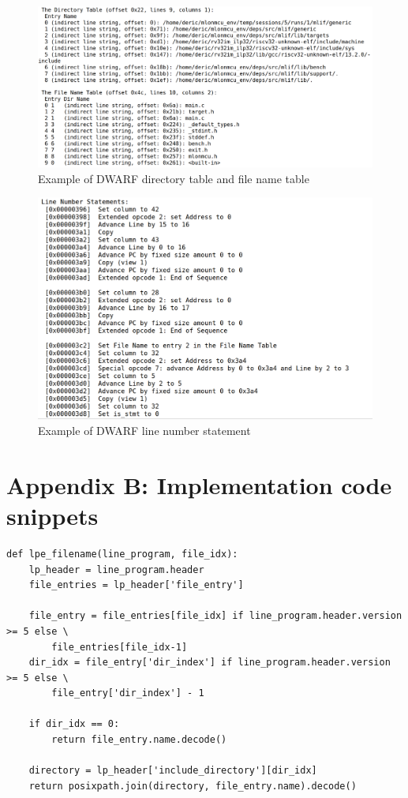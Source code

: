 \begin{figure}[ht]
    \centering
    \includegraphics[width=.95\linewidth]{figures/DWARF_debug_prologue.png}
    \caption{Example of DWARF directory table and file name table}
    \label{fig:dwarf_debug_prologue}
\end{figure}

\begin{figure}[ht]
    \centering
    \includegraphics[width=.85\linewidth]{figures/DWARF_debug_main.png}
    \caption{Example of DWARF line number statement}
    \label{fig:dwarf_debug_main}
\end{figure}

\section{Appendix B: Implementation code snippets}
\begin{center}
\begin{minipage}{\textwidth}
\begin{lstlisting}
def lpe_filename(line_program, file_idx):
    lp_header = line_program.header
    file_entries = lp_header['file_entry']

    file_entry = file_entries[file_idx] if line_program.header.version >= 5 else \
        file_entries[file_idx-1]
    dir_idx = file_entry['dir_index'] if line_program.header.version >= 5 else \
        file_entry['dir_index'] - 1

    if dir_idx == 0:
        return file_entry.name.decode()

    directory = lp_header['include_directory'][dir_idx]
    return posixpath.join(directory, file_entry.name).decode()
\end{lstlisting}
\end{minipage}
\end{center}


